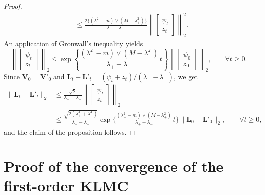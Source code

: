 \documentclass[a4paper,bej,preprint,reqno]{imsart}
\newcommand\bL{\boldsymbol L}
\newcommand\bV{\boldsymbol V}
\begin{document}
\begin{proof}
\begin{align}
				&\le \frac{2\{(\lambda_-^2-m)\vee(M-\lambda_+^2)\}}{\lambda_+-\lambda_-}
						\left\|
						\begin{bmatrix}
						\psi_t  \\
						z_t
						\end{bmatrix}
						\right\|_2^2.
\end{align}
An application of Gronwall's inequality yields
$$
\left\|
	\begin{bmatrix}
     \psi_t  \\
      z_t
	\end{bmatrix}\right\|_2\le \exp\left\{\frac{(\lambda_-^2-m)\vee(M-\lambda_+^2)}
	{\lambda_+-\lambda_-}\,t\right\}\left\|\begin{bmatrix}
     \psi_0 \\
      z_0
\end{bmatrix}\right\|_2,\qquad \forall t\ge 0.
$$
Since $\bV_0=\bV'_0$ and $\bL_t-\bL'_t = (\psi_t+z_t)/(\lambda_+-\lambda_-)$, we get
\begin{align}
\|\bL_t-\bL'_t\|_2
	&\le \frac{\sqrt{2}}{\lambda_+-\lambda_-}\left\|
	\begin{bmatrix}
     \psi_t  \\
      z_t
	\end{bmatrix}\right\|_2\\
	&\le \frac{\sqrt{2(\lambda_+^2+\lambda_-^2)}}{\lambda_+-\lambda_-}
	\exp\bigg\{\frac{(\lambda_-^2-m)\vee(M-\lambda_+^2)}
	{\lambda_+-\lambda_-}\,t\bigg\}
	\|\bL_0-\bL'_0\|_2,\qquad \forall t\ge 0,
\end{align}
and the claim of the proposition follows.
\end{proof}



\section{Proof of the convergence of the first-order KLMC}\label{sec:proofKLMC}
\end{document}
